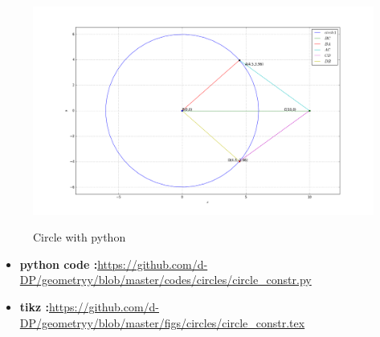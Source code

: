 \begin{frame}
\begin{figure}[!ht]
\resizebox{0.5\linewidth}{!}
{
\includegraphics[scale=1.5]{./figs/circles/circle_constr.png}
}
\caption{Circle with python}
\label{fig:foo}
\end{figure}
\begin{itemize}
\item \textbf{python code :}\url{https://github.com/d-DP/geometryy/blob/master/codes/circles/circle_constr.py}\\
\item \textbf{tikz :}\url{https://github.com/d-DP/geometryy/blob/master/figs/circles/circle_constr.tex}
\end{itemize}
\end{frame}